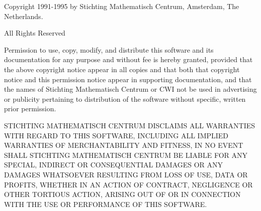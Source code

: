 Copyright 1991-1995 by Stichting Mathematisch Centrum, Amsterdam,
The Netherlands.

\begin{center}
All Rights Reserved
\end{center}

Permission to use, copy, modify, and distribute this software and its
documentation for any purpose and without fee is hereby granted,
provided that the above copyright notice appear in all copies and that
both that copyright notice and this permission notice appear in
supporting documentation, and that the names of Stichting Mathematisch
Centrum or CWI not be used in advertising or publicity pertaining to
distribution of the software without specific, written prior permission.

STICHTING MATHEMATISCH CENTRUM DISCLAIMS ALL WARRANTIES WITH REGARD TO
THIS SOFTWARE, INCLUDING ALL IMPLIED WARRANTIES OF MERCHANTABILITY AND
FITNESS, IN NO EVENT SHALL STICHTING MATHEMATISCH CENTRUM BE LIABLE
FOR ANY SPECIAL, INDIRECT OR CONSEQUENTIAL DAMAGES OR ANY DAMAGES
WHATSOEVER RESULTING FROM LOSS OF USE, DATA OR PROFITS, WHETHER IN AN
ACTION OF CONTRACT, NEGLIGENCE OR OTHER TORTIOUS ACTION, ARISING OUT
OF OR IN CONNECTION WITH THE USE OR PERFORMANCE OF THIS SOFTWARE.
